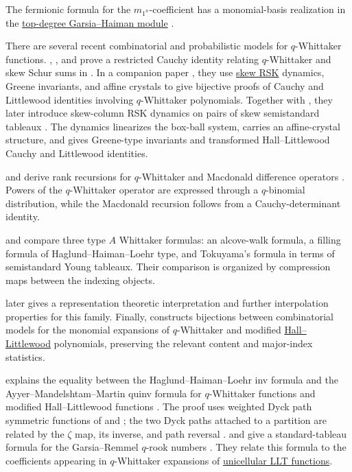 The fermionic formula for the $m_{1^n}$-coefficient has a monomial-basis
realization in the \hyperref[macdonaldHTopDegreeBases]{top-degree
Garsia--Haiman module} \cite[Thm.~4]{Chou2026x}.

There are several recent combinatorial and probabilistic models for
$q$-Whittaker functions.  , ,
and  prove a restricted Cauchy identity relating
$q$-Whittaker and skew Schur sums in \cite{ImamuraMucciconiSasamoto2021x}.
In a companion paper \cite{ImamuraMucciconiSasamoto2021y}, they use
\hyperref[skewRSK]{skew RSK} dynamics, Greene invariants, and affine crystals
to give bijective proofs of Cauchy and Littlewood identities involving
$q$-Whittaker polynomials.
Together with , they later introduce skew-column RSK
dynamics on pairs of skew semistandard tableaux
\cite{ImamuraMucciconiSasamotoScrimshaw2026x}.  The dynamics linearizes the
box-ball system, carries an affine-crystal structure, and gives Greene-type
invariants and transformed Hall--Littlewood Cauchy and Littlewood identities.

 and  derive rank recursions
for $q$-Whittaker and Macdonald difference operators
\cite{DiFrancescoVu2026x}.  Powers of the $q$-Whittaker operator are expressed
through a $q$-binomial distribution, while the Macdonald recursion follows
from a Cauchy-determinant identity.

 and 
\cite{LenartSidoli2021x} compare three type $A$ Whittaker formulas: an
alcove-walk formula, a filling formula of Haglund--Haiman--Loehr type, and
Tokuyama's formula in terms of semistandard Young tableaux.  Their comparison
is organized by compression maps between the indexing objects.

 \cite{Korotkikh2022x} later gives a representation
theoretic interpretation and further interpolation properties for this family.
Finally,
 \cite{Ratheesh2024x} constructs
bijections between combinatorial models for the monomial expansions of
$q$-Whittaker and modified \hyperref[hallLittlewoodH]{Hall--Littlewood}
polynomials, preserving the relevant content and major-index statistics.

 explains the equality between the
Haglund--Haiman--Loehr inv formula and the Ayyer--Mandelshtam--Martin quinv
formula for $q$-Whittaker functions and modified Hall--Littlewood functions
\cite{Bhattacharya2025}.  The proof uses weighted Dyck path symmetric
functions of  and ; the two Dyck paths
attached to a partition are related by the $\zeta$ map, its inverse, and
path reversal \cite[Cor.~2.5 and Thm.~2.8]{Bhattacharya2025}.
 and  give a standard-tableau
formula for the Garsia--Remmel $q$-rook numbers
\cite{BasuBhattacharya2025x}.  They relate this formula to the coefficients
appearing in $q$-Whittaker expansions of
\hyperref[unicellularLLT]{unicellular LLT functions}.

